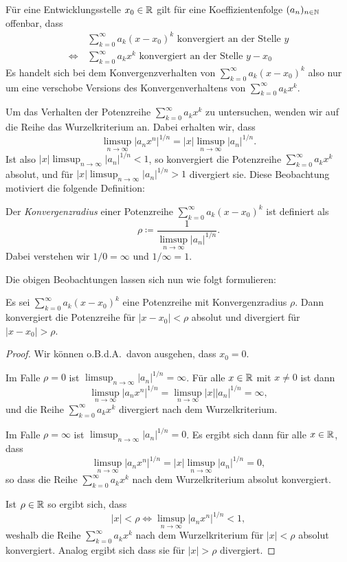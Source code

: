 \documentclass[a4paper,10pt]{article}
\begin{document}
Für eine Entwicklungsstelle $x_0 \in \mathbb{R}$ gilt für eine Koeffizientenfolge $(a_n)_{n \in \mathbb{N}}$ offenbar, dass
\begin{align*}
 &\sum_{k=0}^\infty a_k (x-x_0)^k \text{ konvergiert an der Stelle } y \\
 \Leftrightarrow\,
 &\sum_{k=0}^\infty a_k x^k \text{ konvergiert an der Stelle } y-x_0
\end{align*}
Es handelt sich bei dem Konvergenzverhalten von $\sum_{k=0}^\infty a_k (x-x_0)^k$ also nur um eine verschobe Versions des Konvergenverhaltens von $\sum_{k=0}^\infty a_k x^k$.


Um das Verhalten der Potenzreihe $\sum_{k=0}^\infty a_k x^k$ zu untersuchen, wenden wir auf die Reihe das Wurzelkriterium an. Dabei erhalten wir, dass
\[
 \limsup_{n \to \infty} |a_n x^n|^{1/n}
 = |x| \limsup_{n \to \infty} |a_n|^{1/n}.
\]
Ist also $|x| \limsup_{n \to \infty} |a_n|^{1/n} < 1$, so konvergiert die Potenzreihe $\sum_{k=0}^\infty a_k x^k$ absolut, und für $|x| \limsup_{n \to \infty} |a_n|^{1/n} > 1$ divergiert sie. Diese Beobachtung motiviert die folgende Definition:


\begin{defi}
 Der \emph{Konvergenzradius} einer Potenzreihe $\sum_{k=0}^\infty a_k (x-x_0)^k$ ist definiert als
 \[
  \rho \coloneqq \frac{1}{\limsup_{n \to \infty} |a_n|^{1/n}}.
 \]
 Dabei verstehen wir $1/0 = \infty$ und $1/\infty = 1$.
\end{defi}


Die obigen Beobachtungen lassen sich nun wie folgt formulieren:


\begin{prop}
 Es sei $\sum_{k=0}^\infty a_k (x-x_0)^k$ eine Potenzreihe mit Konvergenzradius $\rho$. Dann konvergiert die Potenzreihe für $|x-x_0| < \rho$ absolut und divergiert für $|x-x_0| > \rho$.
\end{prop}
\begin{proof}
 Wir können o.B.d.A.\ davon ausgehen, dass $x_0 = 0$.
 
 Im Falle $\rho = 0$ ist $\limsup_{n \to \infty} |a_n|^{1/n} = \infty$. Für alle $x \in \mathbb{R}$ mit $x \neq 0$ ist dann
 \[
  \limsup_{n \to \infty} |a_n x^n|^{1/n}
  = \limsup_{n \to \infty} |x| |a_n|^{1/n}
  = \infty,
 \]
 und die Reihe $\sum_{k=0}^\infty a_k x^k$ divergiert nach dem Wurzelkriterium.
 
 Im Falle $\rho = \infty$ ist $\limsup_{n \to \infty} |a_n|^{1/n} = 0$. Es ergibt sich dann für alle $x \in \mathbb{R}$, dass
 \[
  \limsup_{n \to \infty} |a_n x^n|^{1/n}
  = |x| \limsup_{n \to \infty} |a_n|^{1/n}
  = 0,
 \]
 so dass die Reihe $\sum_{k=0}^\infty a_k x^k$ nach dem Wurzelkriterium absolut konvergiert.
 
 Ist $\rho \in \mathbb{R}$ so ergibt sich, dass
 \[
  |x| < \rho
  \Leftrightarrow
  \limsup_{n \to \infty} |a_n x^n|^{1/n} < 1,
 \]
 weshalb die Reihe $\sum_{k=0}^\infty a_k x^k$ nach dem Wurzelkriterium für $|x| < \rho$ absolut konvergiert. Analog ergibt sich dass sie für $|x| > \rho$ divergiert.
\end{proof}
\end{document}

